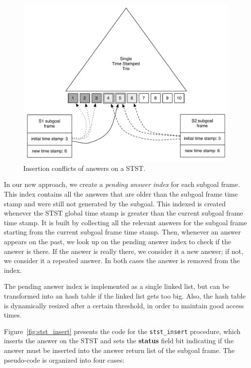 \begin{figure}[ht]
  \centering
    \includegraphics[scale=0.5]{stst_conflicts.pdf}
  \caption{Insertion conflicts of answers on a STST.}
  \label{fig:stst_conflicts}
\end{figure}

In our new approach, we create a \textit{pending answer index} for each subgoal frame.
This index contains all the answers that are older than the subgoal frame time stamp
and were still not generated by the subgoal. This indexed is created whenever the STST
global time stamp is greater than the current subgoal frame time stamp. It is built by
collecting all the relevant answers for the subgoal frame starting from the current
subgoal frame time stamp. Then, whenever an answer appears on the past, we look up on the
pending answer index to check if the answer is there. If the answer is really there,
we consider it a new answer; if not, we consider it a repeated answer. In both cases
the answer is removed from the index.

The pending answer index is implemented as a single linked list, but can be transformed
into an hash table if the linked list gets too big. Also, the hash table is dynamically
resized after a certain threshold, in order to maintain good access times.

Figure~\ref{fig:stst_insert} presents the code for the \texttt{stst\_insert} procedure,
which inserts the answer on the STST and sets the \textbf{status} field bit indicating
if the answer must be inserted into the answer return list of the subgoal frame. The
pseudo-code is organized into four cases:

